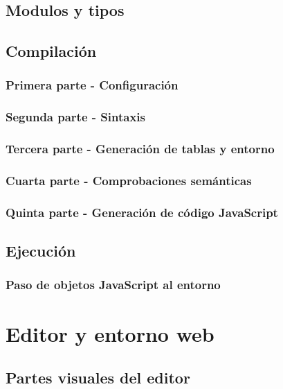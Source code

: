 \documentclass{report}
\begin{document}
	\section{Modulos y tipos}
	
	\section{Compilación}
	
	\subsection{Primera parte - Configuración}
	
	\subsection{Segunda parte - Sintaxis}
	
	\subsection{Tercera parte - Generación de tablas y entorno}
	
	\subsection{Cuarta parte - Comprobaciones semánticas}
	
	\subsection{Quinta parte - Generación de código JavaScript}
	
	\section{Ejecución}
	
	\subsection{Paso de objetos JavaScript al entorno}
	
	\chapter{Editor y entorno web}
	
	\section{Partes visuales del editor}
	
\end{document}
